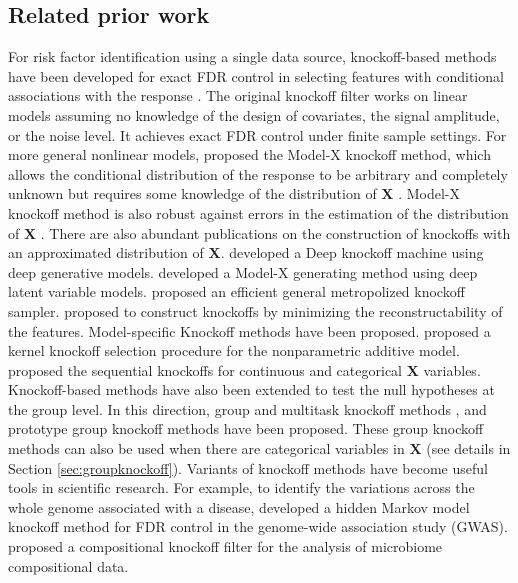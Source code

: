 \documentclass[11pt]{article}
\theoremstyle{plain}
\theoremstyle{definition}
\theoremstyle{remark}
\newcommand{\X}{\mathbf{X}}
\newcommand{\0}{\mathbf{0}}
\begin{document}
\subsection{Related prior work}
For risk factor identification using a single data source, knockoff-based methods have been developed for exact FDR control in selecting features with conditional associations with the response \citep{barber2015, candes2018}. The original knockoff filter \citep{barber2015,barber2019} works on linear models assuming no knowledge of the design of covariates, the signal amplitude, or the noise level. It achieves exact FDR control under finite sample settings. For more general nonlinear models, \citet{candes2018} proposed the Model-X knockoff method, which allows the conditional distribution of the response to be arbitrary and completely unknown but requires some knowledge of the distribution of $\X$ \citep{huang2020}. Model-X knockoff method is also robust against errors in the estimation of the distribution of $\X$ \citep{barber2020}. There are also abundant publications on the construction of knockoffs with an approximated distribution of $\X$. \citet{romano2019} developed a Deep knockoff machine using deep generative models. \citet{liu2019} developed a Model-X generating method using deep latent variable models. \citet{bates2020} proposed an efficient general metropolized knockoff sampler. \citet{spector2020} proposed to construct knockoffs by minimizing the reconstructability of the features. Model-specific Knockoff methods have been proposed.  \citet{dai2022kernel} proposed a kernel knockoff selection procedure for the nonparametric additive model. \citet{kormaksson2021} proposed the sequential knockoffs for continuous and categorical $\X$ variables. Knockoff-based methods have also been extended to test the null hypotheses at the group level. In this direction, group and multitask knockoff methods \citep{dai2016}, and prototype group knockoff methods \citep{chen2020} have been proposed. These group knockoff methods can also be used when there are categorical variables in $\X$ (see details in Section \ref{sec:groupknockoff}). Variants of knockoff methods have become useful tools in scientific research. For example, to identify the variations across the whole genome associated with a disease, \citet{sesia2019} developed a hidden Markov model knockoff method for FDR control in the genome-wide association study (GWAS). \citet{srinivasan2022} proposed a compositional knockoff filter for the analysis of microbiome compositional data.
\end{document}
